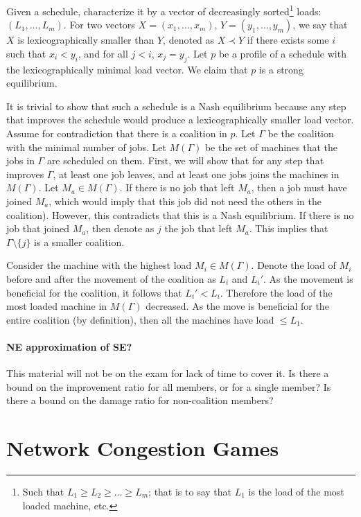 \documentclass{idc_msc}
\begin{document}
Given a schedule, characterize it by a vector of decreasingly sorted\footnote{Such that \(L_1 \ge L_2 \ge \ldots \ge L_m\); that is to say that \(L_1\) is the load of the most loaded machine, etc.} loads: \((L_1, \ldots, L_m)\).
For two vectors \(X=(x_1,\ldots,x_m)\), \(Y=(y_1, \ldots, y_m)\), we say that \(X\) is lexicographically smaller than \(Y\), denoted as \(X \prec Y\) if there exists some \(i\) such that \(x_i < y_i\), and for all \(j < i\), \(x_j = y_j\).
Let \(p\) be a profile of a schedule with the lexicographically minimal load vector.
We claim that \(p\) is a strong equilibrium.

It is trivial to show that such a schedule is a Nash equilibrium because any step that improves the schedule would produce a lexicographically smaller load vector.
Assume for contradiction that there is a coalition in \(p\).
Let \(\Gamma\) be the coalition with the minimal number of jobs.
Let \(M(\Gamma)\) be the set of machines that the jobs in \(\Gamma\) are scheduled on them.
First, we will show that for any step that improves \(\Gamma\), at least one job leaves, and at least one jobs joins the machines in \(M(\Gamma)\).
Let \(M_a \in M(\Gamma)\).
If there is no job that left \(M_a\), then a job must have joined \(M_a\), which would imply that this job did not need the others in the coalition).
However, this contradicts that this is a Nash equilibrium.
If there is no job that joined \(M_a\), then denote as \(j\) the job that left \(M_a\).
This implies that \(\Gamma \setminus \{j\}\) is a smaller coalition.

Consider the machine with the highest load \(M_i \in M(\Gamma)\).
Denote the load of \(M_i\) before and after the movement of the coalition as \(L_i\) and \(L_i'\).
As the movement is beneficial for the coalition, it follows that \(L_i' < L_i\).
Therefore the load of the most loaded machine in \(M(\Gamma)\) decreased.
As the move is beneficial for the entire coalition (by definition), then all the machines have load \(\le L_1\).

\paragraph{NE approximation of SE?}

This material will not be on the exam for lack of time to cover it.
Is there a bound on the improvement ratio for all members, or for a single member?
Is there a bound on the damage ratio for non-coalition members?

\section{Network Congestion Games}
\end{document}

